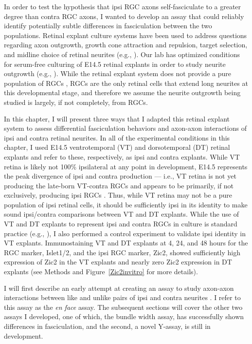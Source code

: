In order to test the hypothesis that ipsi RGC axons self-fasciculate to a greater degree than contra RGC axons, I wanted to develop an \invitro{} assay that could reliably identify potentially subtle differences in fasciculation between the two populations.
Retinal explant culture systems have been used to address questions regarding axon outgrowth, growth cone attraction and repulsion, target selection, and midline choice of retinal neurites (e.g., ).
Our lab has optimized conditions for serum-free culturing of E14.5 retinal explants in order to study neurite outgrowth (e.g., ).
While the retinal explant system does not provide a pure population of RGCs \invitro{}, RGCs are the only retinal cells that extend long neurites at this developmental stage, and therefore we assume the neurite outgrowth being studied is largely, if not completely, from RGCs.

In this chapter, I will present three ways that I adapted this retinal explant system to assess differential fasciculation behaviors and axon-axon interactions of ipsi and contra retinal neurites.
In all of the experimental conditions in this chapter, I used E14.5 ventrotemporal (VT) and dorsotemporal (DT) retinal explants and refer to these, respectively, as ipsi and contra explants.
While VT retina is likely not 100\% ipsilateral at any point in development, E14.5 represents the peak divergence of ipsi and contra production --- i.e., VT retina is not yet producing the late-born VT-contra RGCs and appears to be primarily, if not exclusively, producing ipsi RGCs \cite{drager1985birth}.
Thus, while VT retina may not be a pure population of ipsi retinal cells, it should be sufficiently ipsi in its identity to make sound ipsi/contra comparisons between VT and DT explants.
While the use of VT and DT explants to represent ipsi and contra RGCs in culture is standard practice (e.g., ), I also performed a control experiment to validate ipsi identity in VT explants.
Immunostaining VT and DT explants at 4, 24, and 48 hours \invitro{} for the RGC marker, Islet1/2, and the ipsi RGC marker, Zic2, showed sufficiently high expression of Zic2 in the VT explants and nearly zero Zic2 expression in DT explants (see Methods and Figure~\ref{Zic2invitro} for more details).

I will first describe an early attempt at creating an assay to study axon-axon interactions between like and unlike pairs of ipsi and contra neurites \invitro{}.
I refer to this assay as the \emph{en face} assay.
The subsequent sections will cover the other two assays I developed, one of which, the bundle width assay, has successfully shown differences in fasciculation, and the second, a novel Y-assay, is still in development.